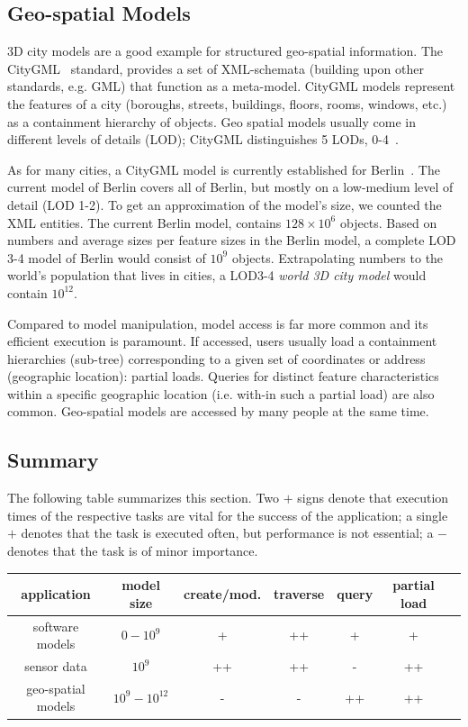 \subsection{Geo-spatial Models}

3D city models are a good example for structured geo-spatial information. The CityGML~\cite{cityGML} standard, provides a set of XML-schemata (building upon other standards, e.g. GML) that function as a meta-model. CityGML models represent the features of a city (boroughs, streets, buildings, floors, rooms, windows, etc.) as a containment hierarchy of objects. Geo spatial models usually come in different levels of details (LOD); CityGML distinguishes 5 LODs, 0-4~\cite{cityGML}. 

As for many cities, a CityGML model is currently established for Berlin~\cite{berlinGML}. The current model of Berlin covers all of Berlin, but mostly on a low-medium level of detail (LOD 1-2). To get an approximation of the model's size, we counted the XML entities. The current Berlin model, contains $128\times 10^6$ objects. Based on numbers and average sizes per feature sizes in the Berlin model, a complete LOD 3-4 model of Berlin would consist of $10^9$ objects. Extrapolating numbers to the world's population that lives in cities, a LOD3-4 \emph{world 3D city model} would contain $10^{12}$.

Compared to model manipulation, model access is far more common and its efficient execution is paramount. If accessed, users usually load a containment hierarchies (sub-tree) corresponding to a given set of coordinates or address (geographic location): partial loads. Queries for distinct feature characteristics within a specific geographic location (i.e. with-in such a partial load) are also common. Geo-spatial models are accessed by many people at the same time. 

\subsection*{Summary}

The following table summarizes this section. Two $+$ signs denote that execution times of the respective tasks are vital for the success of the application; a single $+$ denotes that the task is executed often, but performance is not essential; a $-$ denotes that the task is of minor importance.

\begin{center}
\begin{tabular}{|c||c|c|c|c|c|c|}
\hline
\bf{application} & \bf{model size} & \bf{create/mod.} & \bf{traverse} & \bf{query} & \bf{partial load} \\
\hline\hline
software models & $0-10^9$ & + & ++ & + & + \\
\hline
sensor data & $10^9$ & ++ & ++ & - & ++ \\
\hline
geo-spatial models & $10^9-10^{12}$ & - & - & ++ & ++ \\
\hline
\end{tabular}
\end{center}